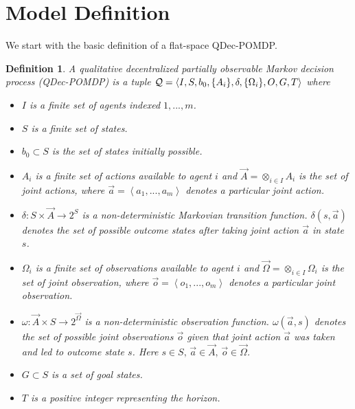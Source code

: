\documentclass[letterpaper]{article}
\newtheorem{definition}{Definition}
\newcommand{\tuple}[1]{\ensuremath{\left \langle  #1 \right \rangle }}
\theoremstyle{definition}
\begin{document}
\section{Model Definition}
We start with the basic definition of a flat-space QDec-POMDP.
\begin{definition} A qualitative decentralized partially observable Markov decision process
(QDec-POMDP) is a tuple ${\cal Q} = \langle  I, S, b_0,\{A_i\}, \delta, \{\Omega_i\}, O, G, T\rangle$
where
\begin{itemize}
\setlength{\itemsep}{-1pt}
\item $I$ is a finite set of agents indexed $1,...,m$.

\item $S$ is a finite set of states.

\item$b_0 \subset S$ is the set of states initially possible.

\item $A_i$ is a finite set of actions available to agent $i$ and
$\vec{A} = \otimes_{i \in I} A_i$ is the set of joint actions, where
$\vec{a} = \tuple{a_1,...,a_m}$ denotes a particular joint action.

\item $\delta: S \times \vec{A} \rightarrow 2^S$ is a non-deterministic Markovian transition function. $\delta(s, \vec{a})
$ denotes the set of possible outcome states after taking joint action $\vec{a}$ in state $s$.

\item $\Omega_i$ is a finite set of observations available to agent $i$ and
$\vec{\Omega} = \otimes_{i \in I} \Omega_i$ is the set of joint
observation, where $\vec{o} = \tuple{o_1,...,o_m}$ denotes a particular joint
observation.

\item $\omega : \vec{A} \times S \rightarrow 2^{\vec{\Omega}}$ is a {\em non-deterministic\/} observation function. $\omega(\vec{a}, s)$
denotes the set of possible joint observations $\vec{o}$ given that
joint action $\vec{a}$ was taken and led to outcome state $s$. Here $s \in S,\, \vec{a}
\in \vec{A},\, \vec{o} \in \vec{\Omega}$.

\item $G \subset S$ is a set of goal states.

\item $T$ is a positive integer representing the horizon.

\end{itemize}
\label{11_def:DEC-POMDP}
\end{definition}
\end{document}
